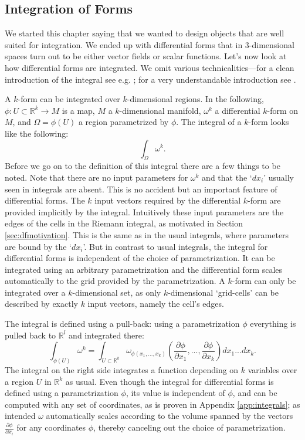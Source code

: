\subsection{Integration of Forms}
\label{sec:integralOfForms}
We started this chapter saying that we wanted to design objects that are well suited for integration. We ended up with differential forms that in 3-dimensional spaces turn out to be either vector fields or scalar functions. Let's now look at how differential forms are integrated. We omit various technicalities---for a clean introduction of the integral see e.g. \cite{globalAnalysis}; for a very understandable introduction see \cite{bachman2006geometric}.

A $k$-form can be integrated over $k$-dimensional regions. In the following, $\phi : U \subset \mathbb R^k \to M$ is a map, $M$ a $k$-dimensional manifold, $\omega^k$ a differential $k$-form on $M$, and $\Omega = \phi(U)$ a region parametrized by $\phi$. The integral of a $k$-form looks like the following:
\[\int_{\Omega} \omega^k.\]
Before we go on to the definition of this integral there are a few things to be noted. Note that there are no input parameters for $\omega^k$ and that the `$dx_i$' usually seen in integrals are absent. This is no accident but an important feature of differential forms. The $k$ input vectors required by the differential $k$-form are provided implicitly by the integral. Intuitively these input parameters are the edges of the cells in the Riemann integral, as motivated in Section \ref{sec:dfmotivation}. This is the same as in the usual integrals, where parameters are bound by the `$dx_i$'. But in contrast to usual integrals, the integral for differential forms is independent of the choice of  parametrization. It can be integrated using an arbitrary parametrization and the differential form scales automatically to the grid provided by the parametrization. 
A $k$-form can only be integrated over a $k$-dimensional set, as only $k$-dimensional `grid-cells' can be described by exactly $k$ input vectors, namely the cell's edges.

The integral is defined using a pull-back: using a parametrization $\phi$ everything is pulled back to $\mathbb R^l$ and integrated there:
\[\int_{\phi(U)} \omega^k = \int_{U\subset\mathbb R^k} \omega_{\phi(x_1,...,x_k)}(\frac{\partial \phi}{\partial x_1},...,\frac{\partial \phi}{\partial x_k}) d x_1...d x_k.\]
The integral on the right side integrates a function depending on $k$ variables over a region $U$ in $\mathbb R^k$ as usual. 
Even though the integral for differential forms is defined using a parametrization $\phi$, its value is independent of $\phi$, and can be computed with any set of coordinates, as is proven in Appendix \ref{app:integrals}; as intended $\omega$ automatically scales according to the volume spanned by the vectors $\frac{\partial \phi}{\partial x_i}$ for any coordinates $\phi$, thereby canceling out the choice of parametrization. 

